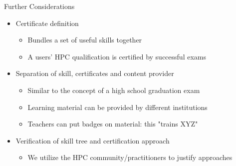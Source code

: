 \documentclass[compress,aspectratio=169]{beamer}
\begin{document}
\begin{frame}{Further Considerations}
	\begin{itemize}
		\item Certificate definition
		\begin{itemize}
			\item Bundles a set of useful skills together %
			\item A users' HPC qualification is certified by successful exams
		\end{itemize}
		\item Separation of skill, certificates and content provider
		\begin{itemize}
			\item Similar to the concept of a high school graduation exam %
			\item Learning material can be provided by different institutions
			\item Teachers can put badges on material: this "trains XYZ"
		\end{itemize}
		\item Verification of skill tree and certification approach
			\begin{itemize}
				\item We utilize the HPC community/practitioners to justify approaches
			\end{itemize}
	\end{itemize}
\end{frame}
\end{document}
